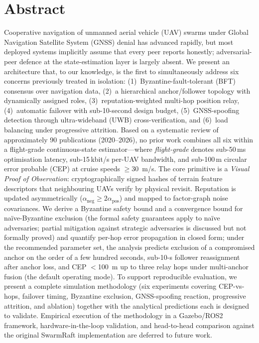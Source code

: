 \documentclass[conference,10pt]{IEEEtran}
\begin{document}
\section*{Abstract}
Cooperative navigation of unmanned aerial vehicle (UAV) swarms under Global Navigation Satellite System (GNSS) denial has advanced rapidly, but most deployed systems implicitly assume that every peer reports honestly; adversarial-peer defence at the state-estimation layer is largely absent. We present an architecture that, to our knowledge, is the first to simultaneously address six concerns previously treated in isolation: (1)~Byzantine-fault-tolerant (BFT) consensus over navigation data, (2)~a hierarchical anchor/follower topology with dynamically assigned roles, (3)~reputation-weighted multi-hop position relay, (4)~automatic failover with sub-10-second design budget, (5)~GNSS-spoofing detection through ultra-wideband (UWB) cross-verification, and (6)~load balancing under progressive attrition. Based on a systematic review of approximately 90 publications (2020--2026), no prior work combines all six within a flight-grade continuous-state estimator---where \emph{flight-grade} denotes sub-50\,ms optimisation latency, sub-15\,kbit/s per-UAV bandwidth, and sub-100\,m circular error probable (CEP) at cruise speeds $\geq$30~m/s. The core primitive is a \emph{Visual Proof of Observation}: cryptographically signed hashes of terrain feature descriptors that neighbouring UAVs verify by physical revisit. Reputation is updated asymmetrically ($\alpha_\text{neg}\!\geq\!2\alpha_\text{pos}$) and mapped to factor-graph noise covariances. We derive a Byzantine safety bound and a convergence bound for na\"ive-Byzantine exclusion (the formal safety guarantees apply to na\"ive adversaries; partial mitigation against strategic adversaries is discussed but not formally proved) and quantify per-hop error propagation in closed form; under the recommended parameter set, the analysis predicts exclusion of a compromised anchor on the order of a few hundred seconds, sub-10-s follower reassignment after anchor loss, and CEP $<$100~m up to three relay hops under multi-anchor fusion (the default operating mode). To support reproducible evaluation, we present a complete simulation methodology (six experiments covering CEP-vs-hops, failover timing, Byzantine exclusion, GNSS-spoofing reaction, progressive attrition, and ablation) together with the analytical predictions each is designed to validate. Empirical execution of the methodology in a Gazebo/ROS2 framework, hardware-in-the-loop validation, and head-to-head comparison against the original SwarmRaft implementation are deferred to future work.
\end{document}
